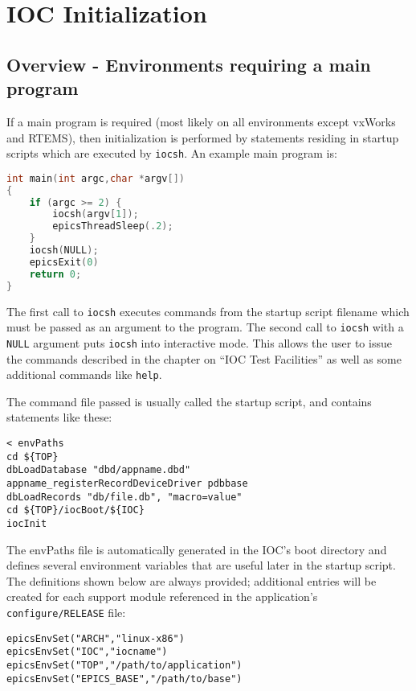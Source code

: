 \chapter{IOC Initialization}

\section{Overview - Environments requiring a main program}

If a main program is required (most likely on all environments except vxWorks and RTEMS), then initialization is performed by statements residing in startup scripts which are executed by \verb|iocsh|.
An example main program is:

\begin{lstlisting}[language=C]
int main(int argc,char *argv[])
{
    if (argc >= 2) {
        iocsh(argv[1]);
        epicsThreadSleep(.2);
    }
    iocsh(NULL);
    epicsExit(0)
    return 0;
}
\end{lstlisting}

The first call to \verb|iocsh| executes commands from the startup script filename which must be passed as an argument to the program.
The second call to \verb|iocsh| with a \verb|NULL| argument puts \verb|iocsh| into interactive mode.
This allows the user to issue the commands described in the chapter on ``IOC Test Facilities'' as well as some additional commands like \verb|help|.

The command file passed is usually called the startup script, and contains statements like these:

\begin{verbatim}
< envPaths
cd ${TOP}
dbLoadDatabase "dbd/appname.dbd"
appname_registerRecordDeviceDriver pdbbase
dbLoadRecords "db/file.db", "macro=value"
cd ${TOP}/iocBoot/${IOC}
iocInit
\end{verbatim}

The envPaths file is automatically generated in the IOC's boot directory and defines several environment variables that are useful later in the startup script.
The definitions shown below are always provided; additional entries will be created for each support module referenced in the application's \verb|configure/RELEASE| file:

\begin{verbatim}
epicsEnvSet("ARCH","linux-x86")
epicsEnvSet("IOC","iocname")
epicsEnvSet("TOP","/path/to/application")
epicsEnvSet("EPICS_BASE","/path/to/base")
\end{verbatim}


